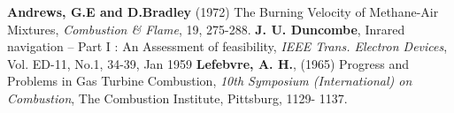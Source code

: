 \newpage
\renewcommand{\bibname}{List of Publications}
\begin{thebibliography}{99}
{\bfseries Andrews, G.E and D.Bradley} (1972) The Burning Velocity of Methane-Air Mixtures,
{\em Combustion \& Flame}, 19, 275-288.
{\bfseries J. U. Duncombe}, Inrared navigation – Part I : An Assessment of feasibility, {\em IEEE
Trans. Electron Devices}, Vol. ED-11, No.1, 34-39, Jan 1959
{\bfseries Lefebvre, A. H.}, (1965) Progress and Problems in Gas Turbine Combustion, {\em 10th
Symposium (International) on Combustion}, The Combustion Institute, Pittsburg, 1129-
1137.
\end{thebibliography}